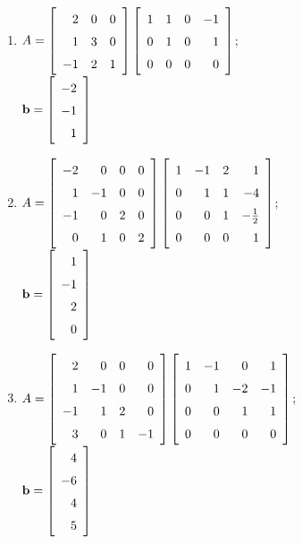 \begin{multicols}{2}
\begin{ex}
\begin{enumerate}[leftmargin=1em,label={\alph*.}]
\item $A = \leftB \begin{array}{rrr}
2 & 0 & 0 \\
1 & 3 & 0 \\
-1 & 2 & 1
\end{array} \rightB \leftB \begin{array}{rrrr}
1 & 1 & 0 & -1\\
0 & 1 & 0 & 1 \\
0 & 0 & 0 & 0
\end{array} \rightB$; \\ $ \vect{b} = \leftB \begin{array}{r}
-2 \\
-1 \\
1
\end{array} \rightB$

\item {\footnotesize $A = \leftB \begin{array}{rrrr}
-2 & 0 & 0 & 0 \\
1 & -1 & 0 & 0 \\
-1 & 0 & 2 & 0 \\
0 & 1 & 0 & 2
\end{array} \rightB \leftB \def\arraystretch{1.5}\begin{array}{rrrr}
1 & -1 & 2 & 1 \\
0 & 1 & 1 & -4 \\
0 & 0 & 1 & -\frac{1}{2} \\
0 & 0 & 0 & 1
\end{array} \rightB$; \\ $\vect{b} = \leftB \begin{array}{r}
1 \\
-1 \\
2 \\
0
\end{array} \rightB$}

\item {\footnotesize $A = \leftB \begin{array}{rrrr}
2 & 0 & 0 & 0 \\
1 & -1 & 0 & 0 \\
-1 & 1 & 2 & 0 \\
3 & 0 & 1 & -1
\end{array} \rightB \leftB \begin{array}{rrrr}
1 & -1 & 0 & 1 \\
0 & 1 & -2 & -1 \\
0 & 0 & 1 & 1 \\
0 & 0 & 0 & 0
\end{array} \rightB$; \\ $\vect{b} = \leftB \begin{array}{r}
4 \\
-6 \\
4 \\
5
\end{array} \rightB$}


\end{enumerate}
\end{ex}
\end{multicols}
